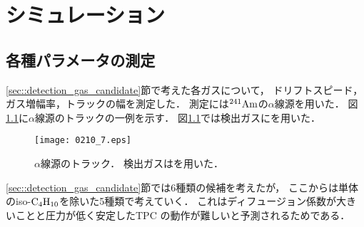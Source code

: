 \documentclass[../master]{subfiles}
\begin{document}
\chapter{シミュレーション}
\label{chap::simulation}
\section{各種パラメータの測定}
\ref{sec::detection_gas_candidate}節で考えた各ガスについて，
ドリフトスピード，ガス増幅率，トラックの幅を測定した．
測定には${}^{241}{\rm Am}$の$\alpha$線源を用いた．
図\ref{fig::a_source_track}に$\alpha$線源のトラックの一例を示す．
図\ref{fig::a_source_track}では検出ガスに\isoButaneHydro を用いた．
\begin{figure}
  \centering
  \texttt{[image: 0210\_7.eps]}
  \caption[$\alpha$線源のトラック．]
          {$\alpha$線源のトラック．
          検出ガスは\isoButaneHydro を用いた．}
  \label{fig::a_source_track}
\end{figure}
\ref{sec::detection_gas_candidate}節では6種類の候補を考えたが，
ここからは単体のiso-$\rm C_{4}H_{10}$を除いた5種類で考えていく．
これはディフュージョン係数が大きいことと圧力が低く安定したTPC の動作が難しいと予測されるためである．
\end{document}
